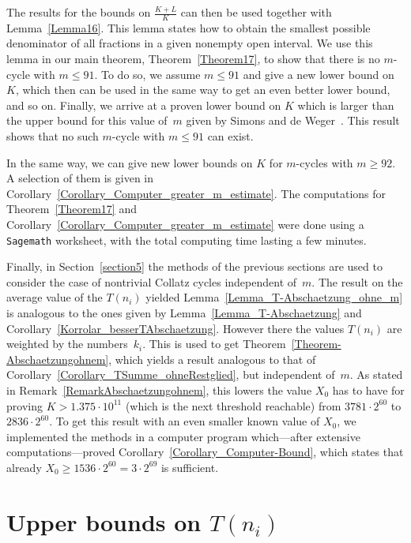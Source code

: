 \documentclass[12pt,reqno]{article}
\begin{document}
The results for the bounds  on $\tfrac{K+L}{K}$ can then be used together with Lemma~\ref{Lemma16}. This lemma states how to obtain the smallest possible denominator of all fractions in a given nonempty open interval. We use this lemma in our main theorem, Theorem~\ref{Theorem17}, to show that there is no $m$-cycle with $m\leq 91$. To do so, we assume $m\leq 91$ and give a new lower bound on $K$, which then can be used in the same way to get an even better lower bound, and so on. Finally, we arrive at a proven lower bound on $K$ which is larger than the upper bound for this value of~$m$ given by Simons and de Weger~\cite{SW-www}. This result shows that no such $m$-cycle with $m\leq 91$ can exist.

In the same way, we can give new lower bounds on $K$ for $m$-cycles with $m\geq 92$. A selection of them is given in Corollary~\ref{Corollary_Computer_greater_m_estimate}. The computations for Theorem~\ref{Theorem17} and Corollary~\ref{Corollary_Computer_greater_m_estimate} were done using a {\tt Sagemath} worksheet, with the total computing time lasting a few minutes.

Finally, in Section~\ref{section5} the methods of the previous sections are used to consider the case of nontrivial Collatz cycles independent of~$m$. The result on the average value of the $T(n_i)$ yielded Lemma~\ref{Lemma_T-Abschaetzung_ohne_m} is analogous to the ones given by Lemma~\ref{Lemma_T-Abschaetzung} and Corollary~\ref{Korrolar_besserTAbschaetzung}. However there the values $T(n_i)$ are weighted by the numbers~$k_i$. This is used to get Theorem~\ref{Theorem-Abschaetzungohnem}, which yields a result analogous to that of Corollary~\ref{Corollary_TSumme_ohneRestglied}, but independent of~$m$. As stated in Remark~\ref{RemarkAbschaetzungohnem}, this lowers the value $X_0$ has to have for proving $K>1.375\cdot 10^{11}$ (which is the next threshold reachable) from $3781\cdot2^{60}$ to $2836\cdot 2^{60}$. To get this result with an even smaller known value of $X_0$, we implemented the methods in a computer program which---after extensive computations---proved Corollary~\ref{Corollary_Computer-Bound}, which states that already $X_0\geq 1536\cdot 2^{60}=3\cdot 2^{69}$ is sufficient.
 
\section{Upper bounds on $T(n_i)$} \label{section3}
\end{document}

